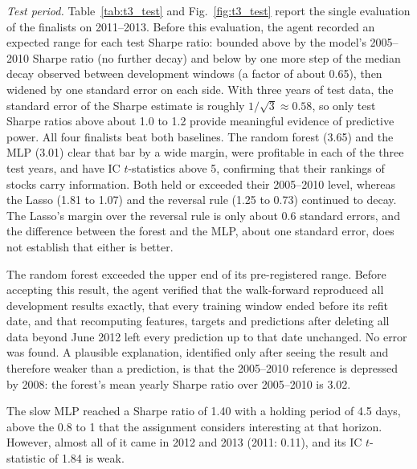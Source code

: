 \textit{Test period.} Table~\ref{tab:t3_test} and Fig.~\ref{fig:t3_test} report the single evaluation of the finalists on 2011--2013. Before this evaluation, the agent recorded an expected range for each test Sharpe ratio: bounded above by the model's 2005--2010 Sharpe ratio (no further decay) and below by one more step of the median decay observed between development windows (a factor of about 0.65), then widened by one standard error on each side. With three years of test data, the standard error of the Sharpe estimate is roughly $1/\sqrt{3} \approx 0.58$, so only test Sharpe ratios above about 1.0 to 1.2 provide meaningful evidence of predictive power. All four finalists beat both baselines. The random forest (3.65) and the MLP (3.01) clear that bar by a wide margin, were profitable in each of the three test years, and have IC $t$-statistics above 5, confirming that their rankings of stocks carry information. Both held or exceeded their 2005--2010 level, whereas the Lasso (1.81 to 1.07) and the reversal rule (1.25 to 0.73) continued to decay. The Lasso's margin over the reversal rule is only about 0.6 standard errors, and the difference between the forest and the MLP, about one standard error, does not establish that either is better.

The random forest exceeded the upper end of its pre-registered range. Before accepting this result, the agent verified that the walk-forward reproduced all development results exactly, that every training window ended before its refit date, and that recomputing features, targets and predictions after deleting all data beyond June 2012 left every prediction up to that date unchanged. No error was found. A plausible explanation, identified only after seeing the result and therefore weaker than a prediction, is that the 2005--2010 reference is depressed by 2008: the forest's mean yearly Sharpe ratio over 2005--2010 is 3.02.

The slow MLP reached a Sharpe ratio of 1.40 with a holding period of 4.5 days, above the 0.8 to 1 that the assignment considers interesting at that horizon. However, almost all of it came in 2012 and 2013 (2011: 0.11), and its IC $t$-statistic of 1.84 is weak.

